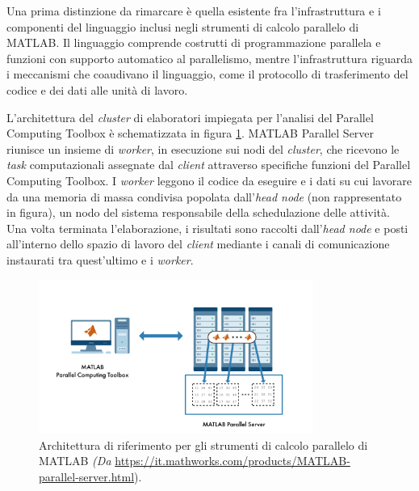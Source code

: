 Una prima distinzione da rimarcare \`e quella esistente fra l'infrastruttura e i componenti del linguaggio inclusi negli strumenti di calcolo parallelo di MATLAB.\newline
Il linguaggio comprende costrutti di programmazione parallela e funzioni con supporto automatico al parallelismo, mentre l'infrastruttura riguarda i meccanismi che coaudivano il linguaggio, come il protocollo di trasferimento del codice e dei dati alle unit\`a di lavoro.

L'architettura del \textit{cluster} di elaboratori impiegata per l'analisi del Parallel Computing Toolbox \`e schematizzata in figura \ref{fig:architetturaRiferimento}.\newline
MATLAB Parallel Server riunisce un insieme di \textit{worker}, in esecuzione sui nodi del \textit{cluster}, che ricevono le
\textit{task} computazionali assegnate dal \textit{client} attraverso specifiche funzioni del Parallel Computing Toolbox. \newline
I \textit{worker} leggono il codice da eseguire e i dati su cui lavorare da una memoria di massa condivisa popolata dall'\textit{head node}
(non rappresentato in figura), un nodo del sistema responsabile della schedulazione delle attivit\`a.\newline
Una volta terminata l'elaborazione, i risultati sono raccolti dall'\textit{head node} e posti all'interno dello spazio di lavoro del \textit{client}
mediante i canali di comunicazione instaurati tra quest'ultimo e i \textit{worker}.

\begin{figure}[htbp]
    \centering
    \includegraphics[width=0.8\textwidth]{../Risorse/Capitolo 2/ReferenceArchitecture.png}
    \caption{Architettura di riferimento per gli strumenti di calcolo parallelo di MATLAB
        \small{\textit{(Da} \url{https://it.mathworks.com/products/MATLAB-parallel-server.html})}.}
    \label{fig:architetturaRiferimento}
\end{figure}

